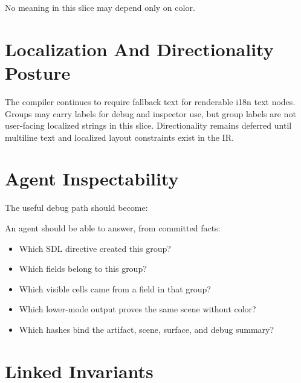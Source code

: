 No meaning in this slice may depend only on color.

\section{Localization And Directionality Posture}\label{record-141-localization-and-directionality-posture}

The compiler continues to require fallback text for renderable i18n text nodes. Groups may carry labels for debug and inspector use, but group labels are not user-facing localized strings in this slice. Directionality remains deferred until multiline text and localized layout constraints exist in the IR.

\section{Agent Inspectability}\label{record-141-agent-inspectability}

The useful debug path should become:



An agent should be able to answer, from committed facts:

\begin{itemize}
\tightlist
\item
  Which SDL directive created this group?
\item
  Which fields belong to this group?
\item
  Which visible cells came from a field in that group?
\item
  Which lower-mode output proves the same scene without color?
\item
  Which hashes bind the artifact, scene, surface, and debug summary?
\end{itemize}

\section{Linked Invariants}\label{record-141-linked-invariants}

